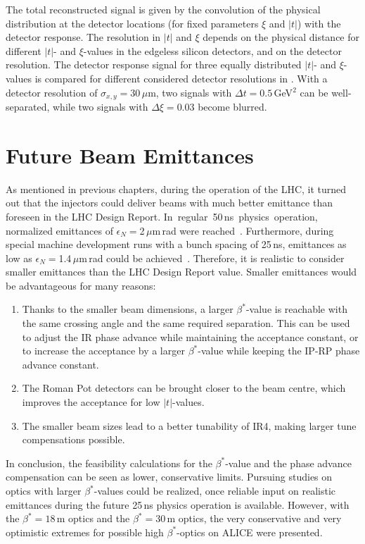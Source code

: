 The total reconstructed signal is given by the convolution of the physical distribution at the detector locations (for fixed parameters $\xi$ and $|t|$) with the detector response. 
The resolution in $|t|$ and $\xi$ depends on the physical distance for different $|t|$- and $\xi$-values in the edgeless silicon detectors, and on the detector resolution. The detector response signal for three equally distributed $|t|$- and $\xi$-values is compared for different considered detector resolutions in . With a detector resolution of $\sigma_{x,y}=30\,\mu$m, two signals with $\Delta t = 0.5\,$GeV$^2$ can be well-separated, while two signals with $\Delta \xi=0.03$ become blurred. 


\section{Future Beam Emittances}\label{chap:different_emittance_scenarios}
As mentioned in previous chapters, during the operation of the LHC, it turned out that the injectors could deliver beams with much better emittance than foreseen in the LHC Design Report. \mbox{In regular 50$\,$ns physics operation}, normalized emittances of $\epsilon_N=$2$\,\mu$m$\,$rad were reached~\cite{emittance_ref}. Furthermore, during special machine development runs with a bunch spacing of 25$\,$ns, emittances as low as $\epsilon_N=$1.4$\,\mu$m$\,$rad could be achieved~\cite{jowett_final_act}. Therefore, it is realistic to consider smaller emittances than the LHC Design Report value. Smaller emittances would be advantageous for many reasons:
\begin{enumerate}
\item Thanks to the smaller beam dimensions, a larger $\beta^*$-value is reachable with the same crossing angle and the same required separation. This can be used to adjust the IR phase advance while maintaining the acceptance constant, or to increase the acceptance by a larger $\beta^*$-value while keeping the IP-RP phase advance constant.
\item The Roman Pot detectors can be brought closer to the beam centre, which improves the acceptance for low $|t|$-values.
\item The smaller beam sizes lead to a better tunability of IR4, making larger tune compensations possible.
\end{enumerate}
%
In conclusion, the feasibility calculations for the $\beta^*$-value and the phase advance compensation can be seen as lower, conservative limits. Pursuing studies on optics with larger $\beta^*$-values could be realized, once reliable input on realistic emittances during the future 25$\,$ns physics operation is available. However, with the $\beta^*=18\,$m optics and the $\beta^*=30\,$m optics, the very conservative and very optimistic extremes for possible high $\beta^*$-optics on ALICE were presented.
%
\newpage
